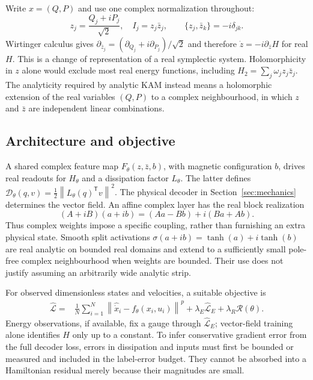 \documentclass[doublespace,Afour,sageh,times]{sagej}
\theoremstyle{definition}
\newcommand{\norm}[1]{\left\lVert#1\right\rVert}
\begin{document}
Write $x=(Q,P)$ and use one complex normalization throughout:
\begin{equation}
 z_j=\frac{Q_j+iP_j}{\sqrt2},\quad I_j=z_j\bar z_j,
 \qquad\{z_j,\bar z_k\}=-i\delta_{jk}.
 \label{eq:complexchart}
\end{equation}
Wirtinger calculus gives $\partial_{\bar z_j}=(\partial_{Q_j}+i\partial_{P_j})/\sqrt2$ and therefore $\dot z=-i\partial_{\bar z}H$ for real $H$. This is a change of representation of a real symplectic system. Holomorphicity in $z$ alone would exclude most real energy functions, including $H_2=\sum_j\omega_jz_j\bar z_j$. The analyticity required by analytic KAM instead means a holomorphic extension of the real variables $(Q,P)$ to a complex neighbourhood, in which $z$ and $\bar z$ are independent linear combinations.

\subsection{Architecture and objective}
A shared complex feature map $F_\theta(z,\bar z,b)$, with magnetic configuration $b$, drives real readouts for $H_\theta$ and a dissipation factor $L_\theta$. The latter defines $\mathcal D_\theta(q,v)=\tfrac12\norm{L_\theta(q)^{\mathsf T}v}^2$. The physical decoder in Section~\ref{sec:mechanics} determines the vector field. An affine complex layer has the real block realization
\begin{equation}
 (A+iB)(a+ib)= (Aa-Bb)+i(Ba+Ab).
 \label{eq:block}
\end{equation}
Thus complex weights impose a specific coupling, rather than furnishing an extra physical state. Smooth split activations $\sigma(a+ib)=\tanh(a)+i\tanh(b)$ are real analytic on bounded real domains and extend to a sufficiently small pole-free complex neighbourhood when weights are bounded. Their use does not justify assuming an arbitrarily wide analytic strip.

For observed dimensionless states and velocities, a suitable objective is
\begin{align}
 \widehat{\mathcal L}={}&\frac1N\sum_{i=1}^N
 \norm{\widehat{\dot x}_i-f_\theta(x_i,u_i)}^p
 +\lambda_E\widehat{\mathcal L}_E
 +\lambda_R\mathcal R(\theta).
 \label{eq:training}
\end{align}
Energy observations, if available, fix a gauge through $\widehat{\mathcal L}_E$; vector-field training alone identifies $H$ only up to a constant. To infer conservative gradient error from the full decoder loss, errors in dissipation and inputs must first be bounded or measured and included in the label-error budget. They cannot be absorbed into a Hamiltonian residual merely because their magnitudes are small.
\end{document}
